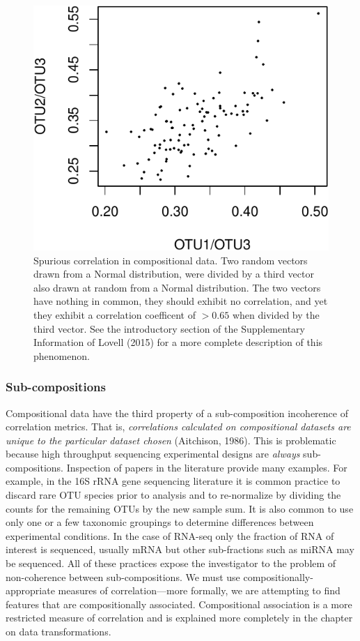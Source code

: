 \documentclass[twocolumn]{article}
\begin{document}
\begin{figure}[htbp]
\centering
\includegraphics{main_files/figure-latex/R_block_correlation-1.pdf}
\caption{\label{correlation} Spurious correlation in compositional data.
Two random vectors drawn from a Normal distribution, were divided by a
third vector also drawn at random from a Normal distribution. The two
vectors have nothing in common, they should exhibit no correlation, and
yet they exhibit a correlation coefficent of \(>0.65\) when divided by
the third vector. See the introductory section of the Supplementary
Information of Lovell (2015) for a more complete description of this
phenomenon.}
\end{figure}

\subsubsection{Sub-compositions}\label{sub-compositions}

Compositional data have the third property of a sub-composition
incoherence of correlation metrics. That is,
\emph{correlations calculated on compositional datasets are unique to the particular dataset chosen}
(Aitchison, 1986). This is problematic because high throughput
sequencing experimental designs are \emph{always} sub-compositions.
Inspection of papers in the literature provide many examples. For
example, in the 16S rRNA gene sequencing literature it is common
practice to discard rare OTU species prior to analysis and to
re-normalize by dividing the counts for the remaining OTUs by the new
sample sum. It is also common to use only one or a few taxonomic
groupings to determine differences between experimental conditions. In
the case of RNA-seq only the fraction of RNA of interest is sequenced,
usually mRNA but other sub-fractions such as miRNA may be sequenced. All
of these practices expose the investigator to the problem of
non-coherence between sub-compositions. We must use
compositionally-appropriate measures of correlation---more formally, we
are attempting to find features that are compositionally associated.
Compositional association is a more restricted measure of correlation
and is explained more completely in the chapter on data transformations.
\end{document}
